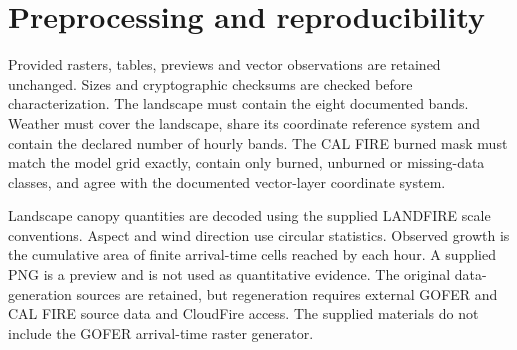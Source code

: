 \begin{table}[H]
\caption{Basis of consequential settings and limits on interpretation.}
\end{table}
\ReportBodyText

\section{Preprocessing and reproducibility}

Provided rasters, tables, previews and vector observations are retained unchanged.
Sizes and cryptographic checksums are checked before characterization. The
landscape must contain the eight documented bands. Weather must cover the
landscape, share its coordinate reference system and contain the declared
number of hourly bands. The CAL FIRE burned mask must match the model grid
exactly, contain only burned, unburned or missing-data classes, and agree with
the documented vector-layer coordinate system.

Landscape canopy quantities are decoded using the supplied LANDFIRE scale
conventions. Aspect and wind direction use circular statistics. Observed growth
is the cumulative area of finite arrival-time cells reached by each hour.
\WeatherOffsetText{} A supplied PNG is a preview and is not used as quantitative
evidence. The original data-generation sources are retained, but regeneration
requires external GOFER and CAL FIRE source data and CloudFire access. The
supplied materials do not include the GOFER arrival-time raster generator.

